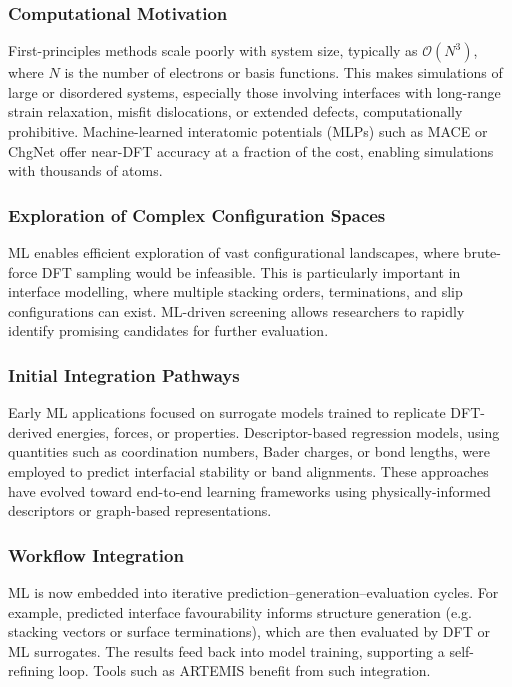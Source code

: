 \subsubsection{Computational Motivation}

First-principles methods scale poorly with system size, typically as \( \mathcal{O}(N^3) \), where \( N \) is the number of electrons or basis functions. This makes simulations of large or disordered systems, especially those involving interfaces with long-range strain relaxation, misfit dislocations, or extended defects, computationally prohibitive. Machine-learned interatomic potentials (MLPs) such as MACE or ChgNet offer near-DFT accuracy at a fraction of the cost, enabling simulations with thousands of atoms.

\subsubsection{Exploration of Complex Configuration Spaces}

ML enables efficient exploration of vast configurational landscapes, where brute-force DFT sampling would be infeasible. This is particularly important in interface modelling, where multiple stacking orders, terminations, and slip configurations can exist. ML-driven screening allows researchers to rapidly identify promising candidates for further evaluation.

\subsubsection{Initial Integration Pathways}

Early ML applications focused on surrogate models trained to replicate DFT-derived energies, forces, or properties. Descriptor-based regression models, using quantities such as coordination numbers, Bader charges, or bond lengths, were employed to predict interfacial stability or band alignments. These approaches have evolved toward end-to-end learning frameworks using physically-informed descriptors or graph-based representations.

\subsubsection{Workflow Integration}

ML is now embedded into iterative prediction--generation--evaluation cycles. For example, predicted interface favourability informs structure generation (e.g. stacking vectors or surface terminations), which are then evaluated by DFT or ML surrogates. The results feed back into model training, supporting a self-refining loop. Tools such as ARTEMIS benefit from such integration.

